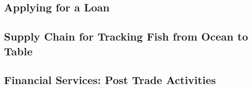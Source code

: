 \subsection{Applying for a Loan}


\subsection{Supply Chain for Tracking Fish from Ocean to Table}


\subsection{Financial Services: Post Trade Activities}
